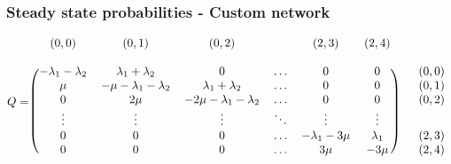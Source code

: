 \begin{frame}
    \frametitle{Steady state probabilities - Custom network}
    \centering

    \tiny
    \begin{equation*}
        Q = 
        \begin{blockarray}{cccccccc}
            (0, 0) & (0, 1) & (0, 2) & & (2, 3) & (2, 4) & &\\
            & & & & & & & &\\
            \begin{block}{(cccccc)cc}
                -\lambda_1 - \lambda_2 & \lambda_1 + \lambda_2 & 0 & \dots & 0 & 0 & & (0,0) \\
                \mu & -\mu - \lambda_1 - \lambda_2 & \lambda_1 + \lambda_2 & \dots & 0 & 0 & & (0,1) \\
                0 & 2\mu & -2\mu - \lambda_1 - \lambda_2 & \dots & 0 & 0 & & (0,2) \\
                \vdots & \vdots & \vdots & \ddots & \vdots & \vdots \\
                0 & 0 & 0 & \dots & -\lambda_1 - 3\mu & \lambda_1 & & (2,3) \\
                0 & 0 & 0 & \dots & 3\mu & -3\mu & & (2,4) \\
            \end{block}
        \end{blockarray}    
    \end{equation*}
    \normalsize


\end{frame}
